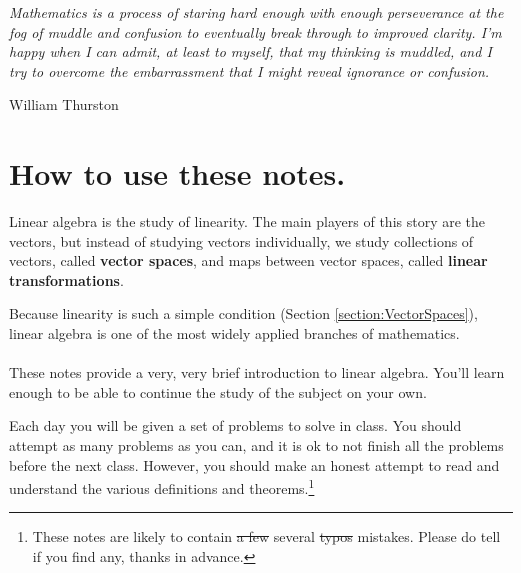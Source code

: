 \maketitle

\setlength{\epigraphwidth}{0.6\textwidth}
\epigraph{\it Mathematics is a process of staring hard enough with enough perseverance at the fog of muddle and confusion to eventually break through to improved clarity. I’m happy when I can admit, at least to myself, that my thinking is muddled, and I try to overcome the embarrassment that I might reveal ignorance or confusion. }{William Thurston}


\section*{How to use these notes.}
\label{sec:intro}

Linear algebra is the study of linearity. The main players of this story are the vectors, but instead of studying vectors individually, we study collections of vectors, called {\bf vector spaces}, and maps between vector spaces, called {\bf linear transformations}.

Because linearity is such a simple condition (Section \ref{section:VectorSpaces}), linear algebra is one of the most widely applied branches of mathematics.\\\\

These notes provide a very, very brief introduction to linear algebra.
You'll learn enough to be able to continue the study of the subject on your own.

Each day you will be given a set of problems to solve in class.
You should attempt as many problems as you can, and it is ok to not finish all the problems before the next class.
However, you should make an honest attempt to read and understand the various definitions and theorems.\footnote{These notes are likely to contain \sout{a few} several \sout{typos} mistakes. Please do tell if you find any, thanks in advance.}
